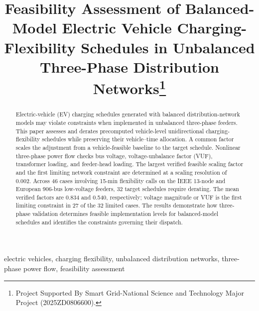 \documentclass[conference,letterpaper]{IEEEtran}
\begin{document}
\title{Feasibility Assessment of Balanced-Model Electric Vehicle Charging-Flexibility Schedules in Unbalanced Three-Phase Distribution Networks\thanks{Project Supported By Smart Grid-National Science and Technology Major Project (2025ZD0806600).}}

\author{
}

\maketitle

\begin{abstract}
Electric-vehicle (EV) charging schedules generated with balanced distribution-network models may violate constraints when implemented in unbalanced three-phase feeders. This paper assesses and derates precomputed vehicle-level unidirectional charging-flexibility schedules while preserving their vehicle--time allocation. A common factor scales the adjustment from a vehicle-feasible baseline to the target schedule. Nonlinear three-phase power flow checks bus voltage, voltage-unbalance factor (VUF), transformer loading, and feeder-head loading. The largest verified feasible scaling factor and the first limiting network constraint are determined at a scaling resolution of 0.002. Across 46 cases involving 15-min flexibility calls on the IEEE 13-node and European 906-bus low-voltage feeders, 32 target schedules require derating. The mean verified factors are 0.834 and 0.540, respectively; voltage magnitude or VUF is the first limiting constraint in 27 of the 32 limited cases. The results demonstrate how three-phase validation determines feasible implementation levels for balanced-model schedules and identifies the constraints governing their dispatch.
\end{abstract}

\begin{IEEEkeywords}
electric vehicles, charging flexibility, unbalanced distribution networks, three-phase power flow, feasibility assessment
\end{IEEEkeywords}
\end{document}
